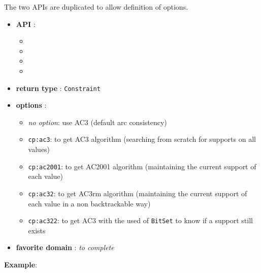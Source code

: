 The two APIs are duplicated to allow definition of options.
\begin{itemize}
	\item \textbf{API} :
	\begin{itemize}
		\item {}
		\item {}
		\item {}
		\item {}
	\end{itemize}
	\item \textbf{return type} : \texttt{Constraint}
	\item \textbf{options} :
	\begin{itemize}
		\item \emph{no option}: use AC3 (default arc consistency)
		\item \texttt{cp:ac3}: to get AC3 algorithm (searching from scratch for supports on all values)
		\item \texttt{cp:ac2001}: to get AC2001 algorithm (maintaining the current support of each value)
		\item \texttt{cp:ac32}: to get AC3rm algorithm (maintaining the current support of each value in a non backtrackable way)
		\item \texttt{cp:ac322}: to get AC3 with the used of \texttt{BitSet} to know if a support still exists
	\end{itemize}
	\item \textbf{favorite domain} : \emph{to complete}
\end{itemize}

\textbf{Example}:

